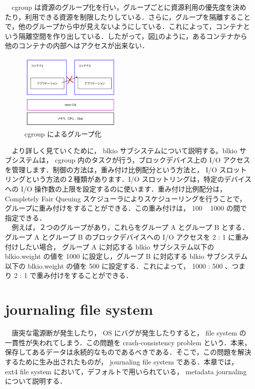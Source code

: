 \documentclass[graduation-thesis]{jsarticle}
\begin{document}
　cgroup は資源のグループ化を行い，グループごとに資源利用の優先度を決めたり，利用できる資源を制限したりしている．さらに，グループを隔離することで，他のグループから中が見えないようにしている．これによって，コンテナという隔離空間を作り出している．したがって，図\ref{fig:grouping}のように，あるコンテナから他のコンテナの内部へはアクセスが出来ない．
\begin{figure}[H]
	\begin{center}
		\includegraphics[width=5.0cm, clip]{images/kakuri.pdf}
		\caption{cgroup によるグループ化}
		\label{fig:grouping}
	\end{center}
\end{figure}
　より詳しく見ていくために， blkio サブシステムについて説明する。blkio サブシステムは， cgroup 内のタスクが行う，ブロックデバイス上の I/O アクセスを管理します．制御の方法は，重み付け比例配分という方法と， I/O スロットリングという方法の２種類があります．I/O スロットリングは，特定のデバイスへの I/O 操作数の上限を設定するのに使います．重み付け比例配分は， Completely Fair Queuing スケジューラによりスケジューリングを行うことで，グループに重み付けをすることができる．この重み付けは， 100 ~ 1000 の間で指定できる．\\
　例えば，２つのグループがあり，これらをグループ A とグループ B とする．グループ A とグループ B のブロックデバイスへの I/O アクセスを 2 : 1 に重み付けしたい場合， グループ A に対応する blkio サブシステム以下の blkio.weight の値を 1000 に設定し，グループ B に対応する blkio サブシステム以下の blkio.weight の値を 500 に設定する．これによって， 1000 : 500 、つまり 2 : 1 で重み付けをすることができる．
　
\clearpage
\section{journaling file system}
\label{sec:journaling}
　唐突な電源断が発生したり， OS にバグが発生したりすると， file system の一貫性が失われてしまう．この問題を crash-consistency problem という．本来，保存してあるデータは永続的なものであるべきである．そこで，この問題を解決するために生み出されたものが， journaling file system である．本章では， ext4 file system において，デフォルトで用いられている， metadata journaling について説明する．
\end{document}
